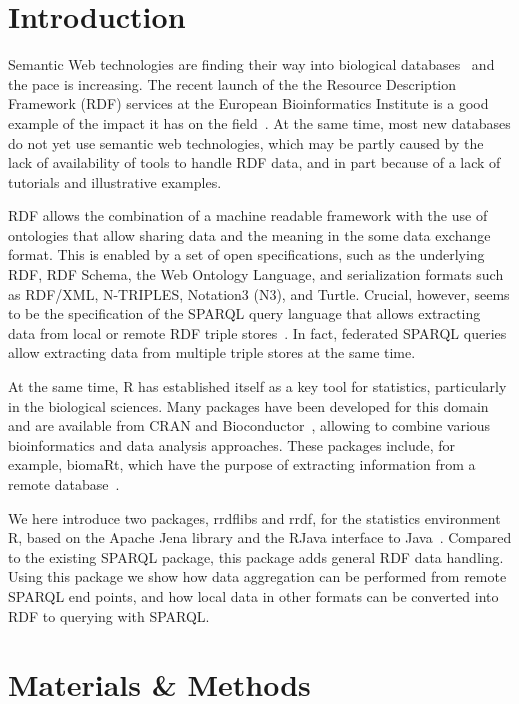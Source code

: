 \documentclass[12pt]{article}
\begin{document}
\section{Introduction}

Semantic Web technologies are finding their way into biological
databases~\cite{Belleau2008,Chen2010,Samwald2011,Williams2012,Willighagen2013}
and the pace is increasing. The recent launch of the the
Resource Description Framework (RDF) services at the European Bioinformatics Institute is a good example
of the impact it has on the field~\cite{EBIRDFPlatform}.
At the same time, most new databases do not yet use semantic web technologies, which may be partly
caused by the lack of availability of tools to handle RDF data, and in part because of a lack
of tutorials and illustrative examples.

RDF allows the combination of a machine readable framework with the use of ontologies that allow
sharing data and the meaning in the some data exchange format. This is enabled by a set of open
specifications, such as the underlying RDF, RDF Schema, the Web Ontology Language, and serialization formats
such as RDF/XML, N-TRIPLES, Notation3 (N3), and Turtle. Crucial, however, seems to be the specification of the SPARQL
query language that allows extracting data from local or remote RDF triple stores~\cite{Seaborne2009}. In fact,
federated SPARQL queries allow extracting data from multiple triple stores at the same time.

At the same time, R has established itself as a key tool for statistics, particularly in the biological
sciences. Many packages have been developed for this domain and are available from CRAN and Bioconductor~\cite{VanHage2013,Gentleman2004},
allowing to combine various bioinformatics and data analysis approaches. These packages include,
for example, biomaRt, which have the purpose of extracting information from a remote database~\cite{Durinck2005}.

We here introduce two packages, rrdflibs and rrdf, for the statistics environment R, based on the Apache
Jena library and the RJava interface to Java~\cite{RMan,Jena,RJava}. Compared to the existing SPARQL
package, this package adds general RDF data handling. Using this package we show how
data aggregation can be performed from remote SPARQL end points, and how local data in other formats
can be converted into RDF to querying with SPARQL.

\section{Materials \& Methods}
\end{document}

